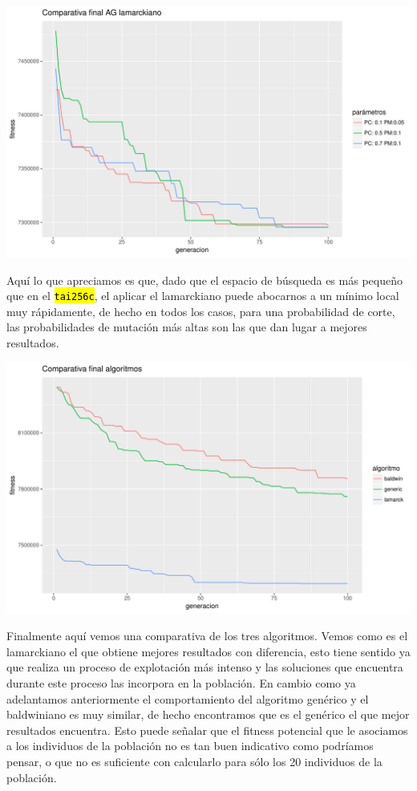 \documentclass[10pt,a4paper]{article}
\newcommand{\code}[1]{\sethlcolor{light-gray}\hl{\texttt{#1}}} %
\begin{document}
\includegraphics[width = \textwidth]{img/graphics/GAlamarckFinal.pdf}

Aquí lo que apreciamos es que, dado que el espacio de búsqueda es más pequeño que en el \code{tai256c}, el aplicar el lamarckiano puede abocarnos a un mínimo local muy rápidamente, de hecho en todos los casos, para una probabilidad de corte, las probabilidades de mutación más altas son las que dan lugar a mejores resultados.

\includegraphics[width = \textwidth]{img/graphics/final.pdf}

Finalmente aquí vemos una comparativa de los tres algoritmos. Vemos como es el lamarckiano el que obtiene mejores resultados con diferencia, esto tiene sentido ya que realiza un proceso de explotación más intenso y las soluciones que encuentra durante este proceso las incorpora en la población. En cambio como ya adelantamos anteriormente el comportamiento del algoritmo genérico y el baldwiniano es muy similar, de hecho encontramos que es el genérico el que mejor resultados encuentra. Esto puede señalar que el fitness potencial que le asociamos a los individuos de la población no es tan buen indicativo como podríamos pensar, o que no es suficiente con calcularlo para sólo los 20 individuos de la población.
\end{document}
